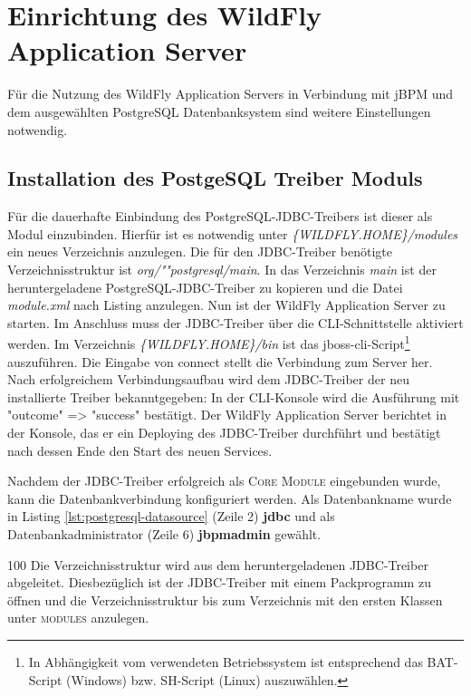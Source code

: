 \section{Einrichtung des WildFly Application Server}
Für die Nutzung des WildFly Application Servers in Verbindung mit jBPM und dem ausgewählten PostgreSQL Datenbanksystem sind weitere Einstellungen notwendig.

\subsection{Installation des PostgeSQL Treiber Moduls}
Für die dauerhafte Einbindung des PostgreSQL-JDBC-Treibers ist dieser als Modul einzubinden. Hierfür ist es notwendig unter \emph{\{WILDFLY.HOME\}/modules} ein neues Verzeichnis anzulegen. Die für den JDBC-Treiber benötigte Verzeichnisstruktur ist \emph{org/""postgresql/main}. In das Verzeichnis \emph{main} ist der heruntergeladene PostgreSQL-JDBC-Treiber zu kopieren und die Datei \emph{module.xml} nach Listing  anzulegen. Nun ist der WildFly Application Server zu starten.
Im Anschluss muss der JDBC-Treiber über die CLI-Schnittstelle aktiviert werden. Im Verzeichnis \emph{\{WILDFLY.HOME\}/bin} ist das jboss-cli-Script\footnote{In Abhängigkeit vom verwendeten Betriebssystem ist entsprechend das BAT-Script (Windows) bzw. SH-Script (Linux) auszuwählen.} auszuführen.
Die Eingabe von {\ttfamily connect} stellt die Verbindung zum Server her. Nach erfolgreichem Verbindungsaufbau wird dem JDBC-Treiber der neu installierte Treiber bekanntgegeben: 
In der CLI-Konsole wird die Ausführung mit {\ttfamily "{}outcome"{} => "{}success"{}} bestätigt. Der WildFly Application Server berichtet in der Konsole, das er ein {\ttfamily Deploying} des JDBC-Treiber durchführt und bestätigt nach dessen Ende den Start des neuen Services.

Nachdem der JDBC-Treiber erfolgreich als \textsc{Core Module} eingebunden wurde, kann die Datenbankverbindung konfiguriert werden.
Als Datenbankname wurde in Listing \ref{lst:postgresql-datasource} (Zeile 2) \textbf{jdbc} und als Datenbankadministrator (Zeile 6) \textbf{jbpmadmin} gewählt.
\begin{info}{100}
	Die Verzeichnisstruktur wird aus dem heruntergeladenen JDBC-Treiber abgeleitet. Diesbezüglich ist der JDBC-Treiber mit einem Packprogramm zu öffnen und die Verzeichnisstruktur bis zum Verzeichnis mit den ersten Klassen unter \textsc{modules} anzulegen.
\end{info}